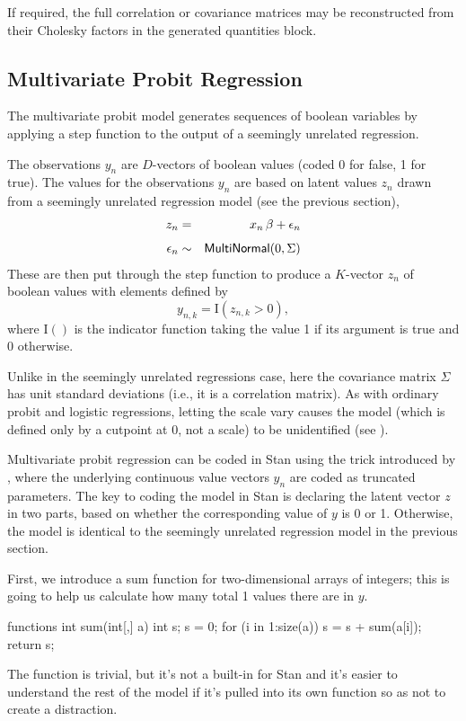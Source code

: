 If required, the full correlation or covariance matrices may be
reconstructed from their Cholesky factors in the generated quantities
block.  


\subsection{Multivariate Probit Regression}

The multivariate probit model generates sequences of boolean variables
by applying a step function to the output of a seemingly unrelated
regression.

The observations $y_n$ are $D$-vectors of boolean values (coded 0 for
false, 1 for true).  The values for the observations $y_n$ are based
on latent values $z_n$ drawn from a seemingly unrelated regression
model (see the previous section), 
%
\begin{eqnarray*}
 z_n & = & x_n \, \beta + \epsilon_n
\\[4pt]
 \epsilon_n & \sim & \distro{MultiNormal}(0, \Sigma)
\end{eqnarray*}
%
These are then put through the step function to produce a $K$-vector $z_n$
of boolean values with elements defined by
\[
y_{n, k} = \mathrm{I}(z_{n, k} > 0),
\]
where $\mathrm{I}()$ is the indicator function taking the value 1 if its
argument is true and 0 otherwise.

Unlike in the seemingly unrelated regressions case, here the
covariance matrix $\Sigma$ has unit standard deviations (i.e., it is a
correlation matrix).  As with ordinary probit and logistic
regressions, letting the scale vary causes the model (which is defined
only by a cutpoint at 0, not a scale) to be unidentified (see
\citep{Greene:2011}).

Multivariate probit regression can be coded in Stan using the trick
introduced by \cite{AlbertChib:1993}, where the underlying continuous
value vectors $y_n$ are coded as truncated parameters.  The key to
coding the model in Stan is declaring the latent vector $z$ in two
parts, based on whether the corresponding value of $y$ is 0 or 1.
Otherwise, the model is identical to the seemingly unrelated
regression model in the previous section.

First, we introduce a sum function for two-dimensional arrays of
integers;  this is going to help us calculate how many total 1 values
there are in $y$.
%
\begin{stancode}
functions {
  int sum(int[,] a) {
    int s;
    s = 0;
    for (i in 1:size(a))
      s = s + sum(a[i]);
    return s;
  }
}
\end{stancode}
%
The function is trivial, but it's not a built-in for Stan and it's easier to
understand the rest of the model if it's pulled into its own function
so as not to create a distraction.

